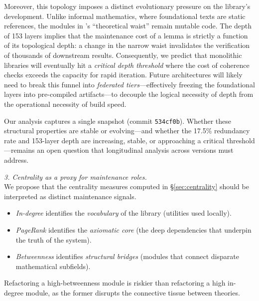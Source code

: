 Moreover, this topology imposes a distinct evolutionary pressure on the library's development. Unlike informal mathematics, where foundational texts are static references, the modules in 's ``theoretical waist'' remain mutable code. The depth of 153 layers implies that the maintenance cost of a lemma is strictly a function of its topological depth: a change in the narrow waist invalidates the verification of thousands of downstream results. Consequently, we predict that monolithic libraries will eventually hit a \textit{critical depth threshold} where the cost of coherence checks exceeds the capacity for rapid iteration. Future architectures will likely need to break this funnel into \textit{federated tiers}---effectively freezing the foundational layers into pre-compiled artifacts---to decouple the logical necessity of depth from the operational necessity of build speed.

Our analysis captures a single snapshot (commit \texttt{534cf0b}). Whether these structural properties are stable or evolving---and whether the 17.5\% redundancy rate and 153-layer depth are increasing, stable, or approaching a critical threshold---remains an open question that longitudinal analysis across  versions must address.

\medskip
\noindent \textit{3. Centrality as a proxy for maintenance roles.} \\
We propose that the centrality measures computed in \S\ref{sec:centrality} should be interpreted as distinct maintenance signals.
\begin{itemize}
    \item \textit{In-degree} identifies the \textit{vocabulary} of the library (utilities used locally).
    \item \textit{PageRank} identifies the \textit{axiomatic core} (the deep dependencies that underpin the truth of the system).
    \item \textit{Betweenness} identifies \textit{structural bridges} (modules that connect disparate mathematical subfields).
\end{itemize}
Refactoring a high-betweenness module is riskier than refactoring a high in-degree module, as the former disrupts the connective tissue between theories.

